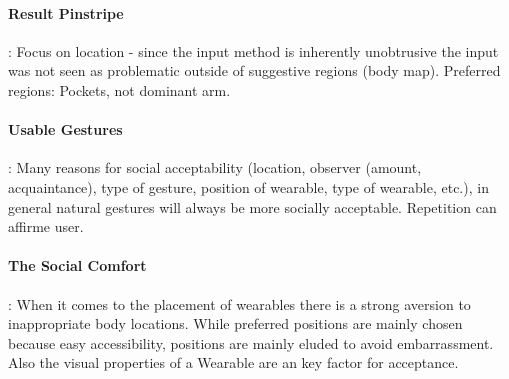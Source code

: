 \documentclass{sigchi}
\begin{document}
\paragraph{Result Pinstripe} \cite{pinstripe}: Focus on location - since the input method is inherently unobtrusive the input was not seen as problematic outside of suggestive regions (body map). Preferred regions: Pockets, not dominant arm.

\paragraph{Usable Gestures} \cite{usable-gesture}: Many reasons for social acceptability (location, observer (amount, acquaintance), type of gesture, position of wearable, type of wearable, etc.), in general natural gestures will always be more socially acceptable. Repetition can affirme user.

\paragraph{The Social Comfort} \cite{social-comfort}: When it comes to the placement of wearables there is a strong aversion to inappropriate body locations. While preferred positions are mainly chosen because easy accessibility, positions are mainly eluded to avoid embarrassment. Also the visual properties of a Wearable are an key factor for acceptance.


% 


\end{document}
